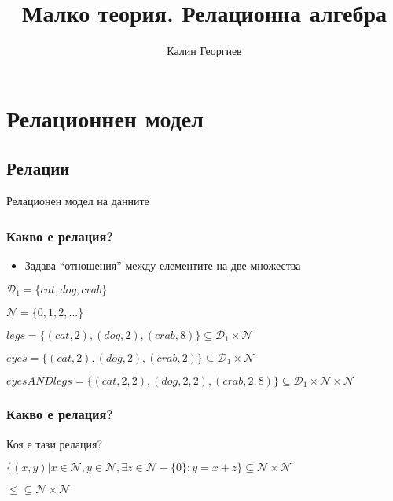 \documentclass{beamer}
\begin{document}
\title[Увод в програмирането]{Малко теория. Релационна алгебра} 
\author{Калин Георгиев} 
\frame{\titlepage} 

\section{Релационнен модел} 
\subsection{Релации}


\begin{frame}
\centerline{Релационен модел на данните}
\end{frame}

\begin{frame}[fragile]
\frametitle{Какво е релация?}

\begin{itemize}
  \item Задава ``отношения'' между елементите на две множества 
\end{itemize}

\vspace{1em}

$\mathcal{D}_1=\{cat,dog,crab\}$

$\mathcal{N}=\{0,1,2,...\}$

\vspace{1em}

$legs=\{(cat,2),(dog,2),(crab,8)\} \subseteq \mathcal{D}_1 \times \mathcal{N}$

\vspace{1em}

$eyes=\{(cat,2),(dog,2),(crab,2)\} \subseteq \mathcal{D}_1 \times \mathcal{N}$


\vspace{1em}

$eyesANDlegs=\{(cat,2,2),(dog,2,2),(crab,2,8)\} \subseteq \mathcal{D}_1 \times \mathcal{N} \times \mathcal{N}$

\vspace{1em}

\end{frame}


\begin{frame}[fragile]
\frametitle{Какво е релация?}
Коя е тази релация?

$\{(x,y)|x \in \mathcal{N}, y \in \mathcal{N}, \exists z \in \mathcal{N}-\{0\}:y=x+z\} \subseteq \mathcal{N} \times \mathcal {N}$


\pause

\begin{center}
  $\leq \subseteq \mathcal{N} \times \mathcal{N}$
\end{center}

\end{frame}
\end{document}
